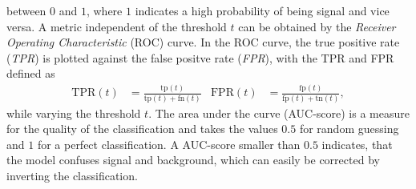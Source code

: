 between $0$ and $1$, where $1$ indicates a high probability of being signal and vice versa.
A metric independent of the threshold $t$ can be obtained by the \textit{Receiver Operating Characteristic} (ROC) curve. In the ROC curve, the true positive rate 
(\textit{TPR}) is plotted against the false positve rate (\textit{FPR}), with the TPR and FPR defined as 
\begin{align}
    \text{TPR}(t) &= \frac{\text{tp}(t)}{\text{tp}(t) + \text{fn}(t)} & \text{FPR}(t) &= \frac{\text{fp}(t)}{\text{fp}(t) + \text{tn}(t)},
    \label{eq:TPR_FPR}
\end{align}
while varying the threshold $t$. The area under the curve (AUC-score) is a measure for the quality of the classification and takes the values $\num{0.5}$ for random guessing 
and $\num{1}$ for a perfect classification. A AUC-score smaller than $\num{0.5}$ indicates, that the model confuses signal and background, which can easily be corrected by 
inverting the classification.
